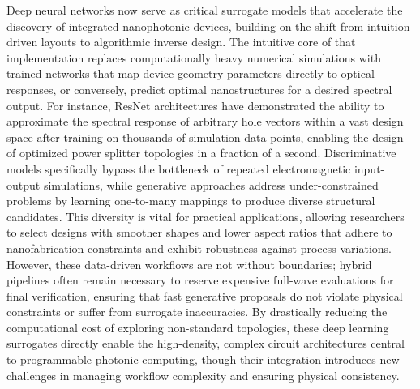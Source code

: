 Deep neural networks now serve as critical surrogate models that accelerate the discovery of integrated nanophotonic devices, building on the shift from intuition-driven layouts to algorithmic inverse design. The intuitive core of that implementation replaces computationally heavy numerical simulations with trained networks that map device geometry parameters directly to optical responses, or conversely, predict optimal nanostructures for a desired spectral output. For instance, ResNet architectures have demonstrated the ability to approximate the spectral response of arbitrary hole vectors within a vast design space after training on thousands of simulation data points, enabling the design of optimized power splitter topologies in a fraction of a second. Discriminative models specifically bypass the bottleneck of repeated electromagnetic input-output simulations, while generative approaches address under-constrained problems by learning one-to-many mappings to produce diverse structural candidates. This diversity is vital for practical applications, allowing researchers to select designs with smoother shapes and lower aspect ratios that adhere to nanofabrication constraints and exhibit robustness against process variations. However, these data-driven workflows are not without boundaries; hybrid pipelines often remain necessary to reserve expensive full-wave evaluations for final verification, ensuring that fast generative proposals do not violate physical constraints or suffer from surrogate inaccuracies. By drastically reducing the computational cost of exploring non-standard topologies, these deep learning surrogates directly enable the high-density, complex circuit architectures central to programmable photonic computing, though their integration introduces new challenges in managing workflow complexity and ensuring physical consistency. \citep{doi_10_1038_s41598_018_37952_2_076b64f9} \citep{doi_10_29026_oes_2022_210012_27973a69} \citep{doi_10_1109_access_2026_3697666_bd5258a6}

